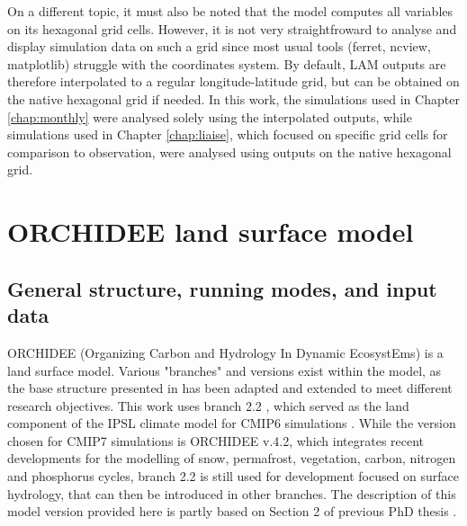 \hfill

On a different topic, it must also be noted that the model computes all variables on its hexagonal grid cells. However, it is not very straightfroward to analyse and display simulation data on such a grid since most usual tools (ferret, ncview, matplotlib) struggle with the coordinates system. 
By default, LAM outputs are therefore interpolated to a regular longitude-latitude grid, but can be obtained on the native hexagonal grid if needed.
In this work, the simulations used in Chapter \ref{chap:monthly} were analysed solely using the interpolated outputs, while simulations used in Chapter \ref{chap:liaise}, which focused on specific grid cells for comparison to observation, were analysed using outputs on the native hexagonal grid.


\section{ORCHIDEE land surface model}
\subsection{General structure, running modes, and input data}
ORCHIDEE (Organizing Carbon and Hydrology In Dynamic EcosystEms) is a land surface model. Various "branches" and versions exist within the model, as the base structure presented in \citet{krinner_dynamic_2005} has been adapted and extended to meet different research objectives. 
This work uses branch 2.2 \citep{cheruy_improved_2020}, which served as the land component of the IPSL climate model for CMIP6 simulations \citep{boucher_presentation_2020}. While the version chosen for CMIP7 simulations is ORCHIDEE v.4.2, which integrates recent developments for the modelling of snow, permafrost, vegetation, carbon, nitrogen and phosphorus cycles, branch 2.2 is still used for development focused on surface hydrology, that can then be introduced in other branches.
The description of this model version provided here is partly based on Section 2 of previous PhD thesis \citep{campoy_influence_2013,arboleda-obando_feedback_2023}.

